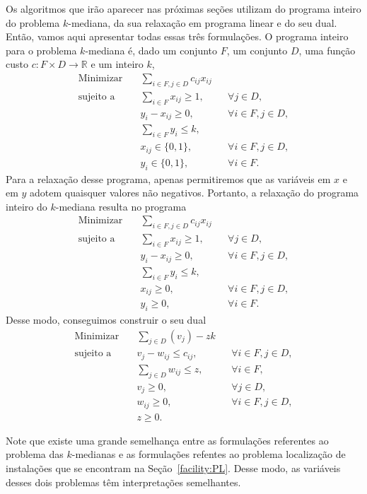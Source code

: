 Os algoritmos que irão aparecer nas próximas seções utilizam do programa inteiro do problema $k$-mediana, da sua relaxação em programa linear e do seu dual. Então, vamos aqui apresentar todas essas três formulações. O programa inteiro para o problema $k$-mediana é, dado um conjunto $F$, um conjunto $D$, uma função custo $c : F\times D \rightarrow \mathbb{R}$ e um inteiro $k$,
\begin{align}
\text{Minimizar} \quad & \sum_{i \in F, j \in D} c_{ij}x_{ij} \\
\text{sujeito a} \quad & \sum_{i \in F} x_{ij} \geq 1, &&\forall j \in D, \\
                       & y_i - x_{ij} \geq 0, &&\forall i \in F, j \in D, \\
                       & \sum_{i \in F} y_i \leq k, \\
                       & x_{ij} \in \{0,1\}, && \forall i \in F,j \in D, \\
                       & y_i \in \{0,1\}, &&\forall i \in F. 
\end{align}
Para a relaxação desse programa, apenas permitiremos que as variáveis em $x$ e em $y$ adotem quaisquer valores não negativos. Portanto, a relaxação do programa inteiro do $k$-mediana resulta no programa
\begin{align}
    \text{Minimizar} \quad & \sum_{i \in F, j \in D} c_{ij}x_{ij} \\
    \text{sujeito a} \quad & \sum_{i \in F} x_{ij} \geq 1, &&\forall j \in D, \\
                           & y_i - x_{ij} \geq 0, &&\forall i \in F, j \in D, \\
                           & \sum_{i \in F} y_i \leq k, \\
                           & x_{ij} \geq 0, && \forall i \in F,j \in D, \\
                           & y_i \geq 0, &&\forall i \in F. 
\end{align}
Desse modo, conseguimos construir o seu dual
\begin{align}
    \text{Minimizar} \quad & \sum_{j \in D} (v_j) - zk \\
    \text{sujeito a} \quad & v_j - w_{ij} \leq c_{ij}, &&\forall i \in F, j\in D, \\
                           & \sum_{j\in D} w_{ij} \leq z, &&\forall i \in F, \\
                           & v_j \geq 0, &&\forall j\in D, \\
                           & w_{ij} \geq 0, && \forall i \in F,j \in D, \\
                           & z \geq 0. 
\end{align}

Note que existe uma grande semelhança entre as formulações referentes ao problema das $k$-medianas e as formulações refentes ao problema localização de instalações que se encontram na Seção~\ref{facility:PL}. Desse modo, as variáveis desses dois problemas têm interpretações semelhantes.
